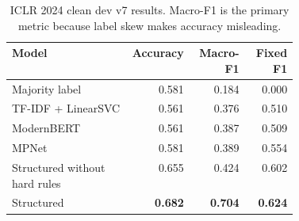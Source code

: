 \begin{table}[t]
\centering
\scriptsize
\setlength{\tabcolsep}{3pt}
\begin{tabular}{p{0.42\linewidth}rrr}
\toprule
Model & Accuracy & Macro-F1 & Fixed F1 \\
\midrule
Majority label & 0.581 & 0.184 & 0.000 \\
TF-IDF + LinearSVC & 0.561 & 0.376 & 0.510 \\
ModernBERT & 0.561 & 0.387 & 0.509 \\
MPNet & 0.581 & 0.389 & 0.554 \\
Structured without hard rules & 0.655 & 0.424 & 0.602 \\
Structured & \textbf{0.682} & \textbf{0.704} & \textbf{0.624} \\
\bottomrule
\end{tabular}
\caption{ICLR 2024 clean dev v7 results. Macro-F1 is the primary metric because label skew makes accuracy misleading.}
\label{tab:main-results}
\end{table}

